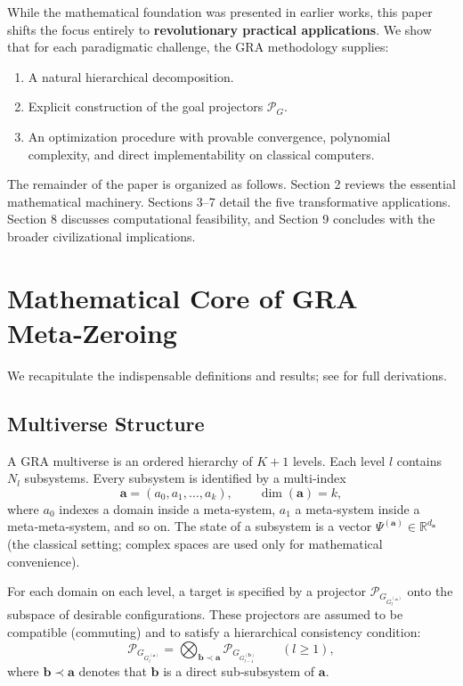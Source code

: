\documentclass[11pt,a4paper]{article}
\theoremstyle{definition}
\newcommand{\pG}{\mathcal{P}_{\!G}}
\begin{document}
While the mathematical foundation was presented in earlier works, this paper shifts the focus entirely to \textbf{revolutionary practical applications}. We show that for each paradigmatic challenge, the GRA methodology supplies:
\begin{enumerate}
    \item A natural hierarchical decomposition.
    \item Explicit construction of the goal projectors $\pG$.
    \item An optimization procedure with provable convergence, polynomial complexity, and direct implementability on classical computers.
\end{enumerate}
The remainder of the paper is organized as follows. Section 2 reviews the essential mathematical machinery. Sections 3–7 detail the five transformative applications. Section 8 discusses computational feasibility, and Section 9 concludes with the broader civilizational implications.

\section{Mathematical Core of GRA Meta‑Zeroing}
\label{sec:math}

We recapitulate the indispensable definitions and results; see \cite{gra-orig} for full derivations.

\subsection{Multiverse Structure}

A GRA multiverse is an ordered hierarchy of $K+1$ levels. Each level $l$ contains $N_l$ subsystems. Every subsystem is identified by a multi‑index
\[
\mathbf{a} = (a_0, a_1, \dots, a_k),\qquad \dim(\mathbf{a})=k,
\]
where $a_0$ indexes a domain inside a meta‑system, $a_1$ a meta‑system inside a meta‑meta‑system, and so on.
The state of a subsystem is a vector $\Psi^{(\mathbf{a})}\in\mathbb{R}^{d_{\mathbf{a}}}$ (the classical setting; complex spaces are used only for mathematical convenience).

For each domain on each level, a target is specified by a projector $\pG_{G_l^{(\mathbf{a})}}$ onto the subspace of desirable configurations. These projectors are assumed to be compatible (commuting) and to satisfy a hierarchical consistency condition:
\[
\pG_{G_l^{(\mathbf{a})}} = \bigotimes_{\mathbf{b}\prec\mathbf{a}} \pG_{G_{l-1}^{(\mathbf{b})}} \qquad (l\ge 1),
\]
where $\mathbf{b}\prec\mathbf{a}$ denotes that $\mathbf{b}$ is a direct sub‑subsystem of $\mathbf{a}$.
\end{document}
